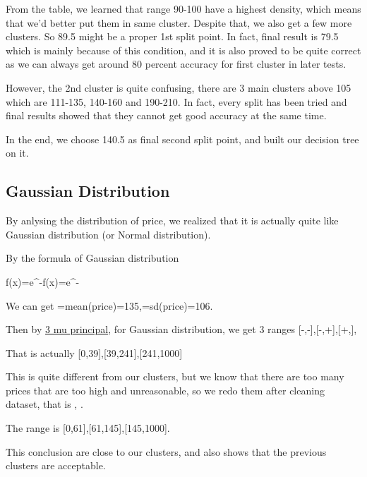 \documentclass{sig-alternate}
\begin{document}
	From the table, we learned that range 90-100 have a highest density, which means that we'd better put them in same cluster. 
	Despite that, we also get a few more clusters. So 89.5 might be a proper 1st split point. In fact, final result
	is 79.5 which is mainly because of this condition, and it is also proved to be quite correct as we can always get 
	around 80 percent accuracy for first cluster in later tests. 

	However, the 2nd cluster is quite confusing, there are 3 main clusters above 105 which are 111-135, 140-160 and 190-210. In fact,
	every split has been tried and final results showed that they cannot get good accuracy at the same time.


	In the end, we choose 140.5 as final second split point, and built our decision tree on it.

	\subsection{Gaussian Distribution}
	
	By anlysing the distribution of price, we realized that it is actually quite like Gaussian distribution (or Normal distribution). 
	
	By the formula of Gaussian distribution


	{\displaystyle f(x)={}\;e^{-{}}\!}{\displaystyle f(x)={}\;e^{-{}}\!}

	We can get \mu=mean(price)=135,\sigma=sd(price)=106. 

	Then by \href{https://en.wikipedia.org/wiki/Normal_distribution}{3 mu principal},  for Gaussian distribution, we get 3 ranges [-\inf,\mu-\sigma],[\mu-\sigma,\mu+\sigma],[\mu+\sigma,\inf],

    That is actually [0,39],[39,241],[241,1000]

	This is quite different from our clusters, but we know that there are too many prices that are too high and unreasonable, so we redo them after cleaning dataset,
	that is , .
	
	The range is [0,61],[61,145],[145,1000]. 
	
	This conclusion are close to our clusters, and also shows that the previous clusters
	are acceptable.
	
\end{document}
